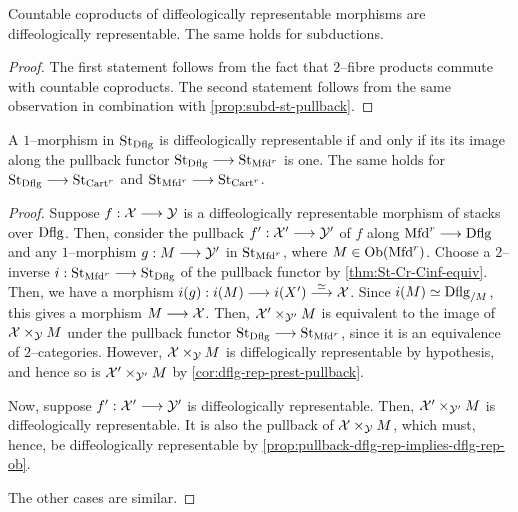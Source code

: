 \documentclass[11pt]{amsart}
\begin{document}
\begin{prop}\label{prop:subd-st-coprod}
Countable coproducts of diffeologically representable morphisms are diffeologically representable.
The same holds for subductions.
\end{prop}
\begin{proof}
The first statement follows from the fact that $2$--fibre products commute with countable
coproducts. The second statement follows from the same observation in combination with
\cref{prop:subd-st-pullback}.
\end{proof}

\begin{prop}\label{prop:diff-rep-morphism-pullback-iff}
A $1$--morphism in $\mathrm{St}_{\mathrm{Dflg}}$ is diffeologically representable if and only if its
its image along the pullback functor $\St_{\Dflg} \to \St_{\Mfd^r}$ is one.
The same holds for $\St_{\Dflg} \to \St_{\Cart^r}$ and
$\St_{\Mfd^r} \to \St_{\Cart^r}$.
\end{prop}
\begin{proof}
Suppose $f : \mcX \to \mcY$ is a diffeologically representable morphism of stacks over $\mathrm{Dflg}$.
Then, consider the pullback $f' : \mcX' \to \mcY'$ of $f$ along $\Mfd^r \to \Dflg$ and
any $1$--morphism $g : M \to \mcY'$ in $\mathrm{St}_{\mathrm{Mfd}^r}$, where $M \in \Ob{\Mfd^r}$.
Choose a $2$--inverse $i : \St_{\Mfd^r} \to \St_{\Dflg}$ of the pullback functor by
\cref{thm:St-Cr-Cinf-equiv}.
Then, we have a morphism $i(g) : i(M) \to i(X') \to[\simeq] \mcX$. Since
$i(M) \simeq \mathrm{Dflg}_{/M}$, this gives a morphism $M \to \mcX$.
Then, $\mathcal{X}' \times_{\mathcal{Y}'} M$ is equivalent to the image of
$\mathcal{X} \times_{\mathcal{Y}} M$ under the pullback functor $\St_{\Dflg} \to \St_{\Mfd^r}$, since
it is an equivalence of $2$--categories. However, $\mathcal{X} \times_\mathcal{Y} M$ is diffelogically
representable by hypothesis, and hence so is $\mathcal{X}' \times_{\mathcal{Y}'} M$ by
\cref{cor:dflg-rep-prest-pullback}.

Now, suppose $f' : \mcX' \to \mcY'$ is diffeologically representable.
Then, $\mathcal{X}' \times_{\mathcal{Y}'} M$ is diffeologically representable. It is also the pullback
of $\mathcal{X} \times_{\mathcal{Y}} M$, which must, hence, be diffeologically representable by
\cref{prop:pullback-dflg-rep-implies-dflg-rep-ob}.

The other cases are similar.
\end{proof}
\end{document}
